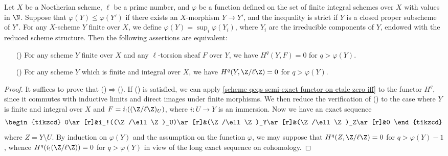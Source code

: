 \begin{proposition}\label{scheme Noe etale sheaf higher cohomology vanish by increasing function iff}
Let $X$ be a Noetherian scheme, $\ell$ be a prime number, and $\varphi$ be a function defined on the set of finite integral schemes over $X$ with values in $\N$. Suppose that $\varphi(Y)\leq\varphi(Y')$ if there exists an $X$-morphism $Y\to Y'$, and the inequality is strict if $Y$ is a closed proper subscheme of $Y'$. For any $X$-scheme $Y$ finite over $X$, we define $\varphi(Y)=\sup_i\varphi(Y_i)$, where $Y_i$ are the irreducible components of $Y$, endowed with the reduced scheme structure. Then the following assertions are equivalent:
\begin{enumerate}
    \item[(\rmnum{1})] For any scheme $Y$ finite over $X$ and any $\ell$-torsion sheaf $F$ over $Y$, we have $H^q(Y,F)=0$ for $q>\varphi(Y)$.
    \item[(\rmnum{2})] For any scheme $Y$ which is finite and integral over $X$, we have $H^q(Y,\Z/\ell\Z)=0$ for $q>\varphi(Y)$.
\end{enumerate}
\end{proposition}
\begin{proof}
It suffices to prove that ()$\Rightarrow$(). If () is satisfied, we can apply \cref{scheme qcqs semi-exact functor on etale zero iff} to the functor $H^q$, since it commutes with inductive limits and direct images under finite morphisms. We then reduce the verification of () to the case where $Y$ is finite and integral over $X$ and $F=i_!((\Z/\ell\Z)_U)$, where $i:U\to Y$ is an immersion. Now we have an exact sequence
\[\begin{tikzcd}
0\ar[r]&i_!((\Z/\ell\Z)_U)\ar[r]&(\Z/\ell\Z)_Y\ar[r]&(\Z/\ell\Z)_Z\ar[r]&0
\end{tikzcd}\]
where $Z=Y\setminus U$. By induction on $\varphi(Y)$ and the assumption on the function $\varphi$, we may suppose that $H^q(Z,\Z/\ell\Z)=0$ for $q>\varphi(Y)-1$, whence $H^q(i_!(\Z/\ell\Z))=0$ for $q>\varphi(Y)$ in view of the long exact sequence on cohomology.
\end{proof}

